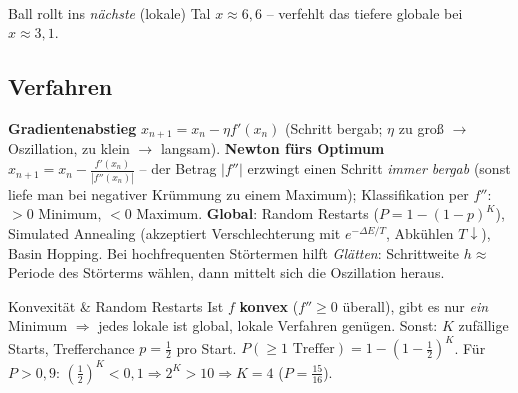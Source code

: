 \documentclass[a4paper,11pt]{article}
\begin{document}
\begin{center}
\\[-2pt]
{\footnotesize\color{muted}Ball rollt ins \emph{nächste} (lokale) Tal $x\!\approx\!6{,}6$ -- verfehlt das tiefere globale bei $x\!\approx\!3{,}1$.}
\end{center}

\subsection{Verfahren}
\textbf{Gradientenabstieg} $x_{n+1}=x_n-\eta f'(x_n)$ (Schritt bergab; $\eta$ zu groß $\to$ Oszillation,
zu klein $\to$ langsam). \textbf{Newton fürs Optimum} $x_{n+1}=x_n-\frac{f'(x_n)}{|f''(x_n)|}$ -- der
Betrag $|f''|$ erzwingt einen Schritt \emph{immer bergab} (sonst liefe man bei negativer Krümmung zu
einem Maximum); Klassifikation per $f''$: $>0$ Minimum, $<0$ Maximum. \textbf{Global}: Random Restarts
($P=1-(1-p)^K$), Simulated Annealing (akzeptiert Verschlechterung mit $e^{-\Delta E/T}$, Abkühlen
$T\downarrow$), Basin Hopping. Bei hochfrequenten Störtermen hilft \emph{Glätten}: Schrittweite
$h\approx$ Periode des Störterms wählen, dann mittelt sich die Oszillation heraus.

\begin{rechnung}{Konvexität \& Random Restarts}
Ist $f$ \textbf{konvex} ($f''\ge0$ überall), gibt es nur \emph{ein} Minimum $\Rightarrow$ jedes lokale
ist global, lokale Verfahren genügen. Sonst: $K$ zufällige Starts, Trefferchance $p=\tfrac12$ pro
Start. $P(\ge1\text{ Treffer})=1-(1-\tfrac12)^K$. Für $P>0{,}9$: $(\tfrac12)^K<0{,}1\Rightarrow 2^K>10
\Rightarrow K=4$ ($P=\tfrac{15}{16}$).
\end{rechnung}
\end{document}
